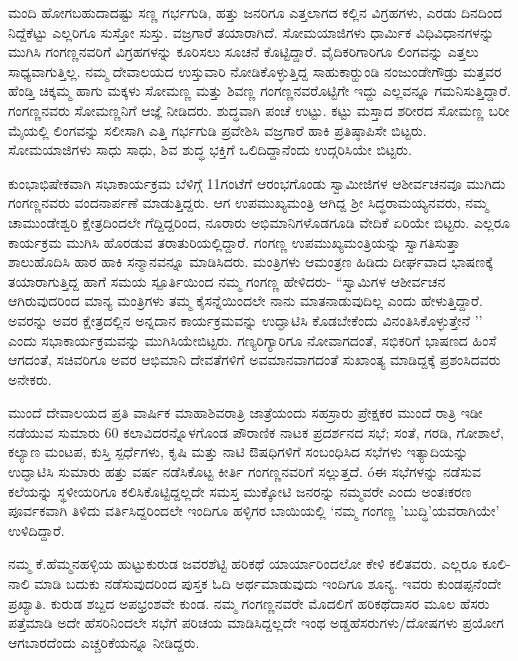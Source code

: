 ಮಂದಿ ಹೋಗಬಹುದಾದಷ್ಟು ಸಣ್ಣ ಗರ್ಭಗುಡಿ, ಹತ್ತು ಜನರಿಗೂ ಎತ್ತಲಾಗದ ಕಲ್ಲಿನ ವಿಗ್ರಹಗಳು, ಎರಡು ದಿನದಿಂದ ನಿದ್ದೆಕೆಟ್ಟು ಎಲ್ಲರಿಗೂ ಸುಸ್ತೋ ಸುಸ್ತು. ವಜ್ರಗಾರೆ ತಯಾರಾಗಿದೆ. ಸೋಮಯಾಜಿಗಳು ಧಾರ್ಮಿಕ ವಿಧಿವಿಧಾನಗಳನ್ನು ಮುಗಿಸಿ ಗಂಗಣ್ಣನವರಿಗೆ ವಿಗ್ರಹಗಳನ್ನು ಕೂರಿಸಲು ಸೂಚನೆ ಕೊಟ್ಟಿದ್ದಾರೆ. ವೈದಿಕರಿಗಾರಿಗೂ ಲಿಂಗವನ್ನು ಎತ್ತಲು ಸಾಧ್ಯವಾಗುತ್ತಿಲ್ಲ. ನಮ್ಮ ದೇವಾಲಯದ ಉಸ್ತುವಾರಿ ನೋಡಿಕೊಳ್ಳುತ್ತಿದ್ದ ಸಾಹುಕಾರ್‍ಹುಂಡಿ ನಂಜುಂಡೇಗೌಡ್ರು ಮತ್ತವರ ಹೆಂಡ್ತಿ ಚಿಕ್ಕಮ್ಮ ಹಾಗು ಮಕ್ಕಳು ಸೋಮಣ್ಣ ಮತ್ತು ಶಿವಣ್ಣ ಗಂಗಣ್ಣನವರೊಟ್ಟಿಗೇ ಇದ್ದು ಎಲ್ಲವನ್ನೂ ಗಮನಿಸುತ್ತಿದ್ದಾರೆ. ಗಂಗಣ್ಣನವರು ಸೋಮಣ್ಣನಿಗೆ ಆಜ್ಞೆ ನೀಡಿದರು. ಶುದ್ಧವಾಗಿ ಪಂಚೆ ಉಟ್ಟು. ಕಟ್ಟು ಮಸ್ತಾದ ಶರೀರದ ಸೋಮಣ್ಣ ಬರೀ ಮೈಯಲ್ಲಿ ಲಿಂಗವನ್ನು ಸಲೀಸಾಗಿ ಎತ್ತಿ ಗರ್ಭಗುಡಿ ಪ್ರವೇಶಿಸಿ ವಜ್ರಗಾರೆ ಹಾಕಿ ಪ್ರತಿಷ್ಠಾಪಿಸೇ ಬಿಟ್ಟರು. ಸೋಮಯಾಜಿಗಳು ಸಾಧು ಸಾಧು, ಶಿವ ಶುದ್ಧ ಭಕ್ತಿಗೆ ಒಲಿದಿದ್ದಾನೆಂದು ಉದ್ಗರಿಸಿಯೇ ಬಿಟ್ಟರು.

ಕುಂಭಾಭಿಷೇಕವಾಗಿ ಸಭಾಕಾರ್ಯಕ್ರಮ ಬೆಳಿಗ್ಗೆ 11ಗಂಟೆಗೆ ಆರಂಭಗೊಂಡು ಸ್ವಾಮೀಜಿಗಳ ಆಶೀರ್ವಚನವೂ ಮುಗಿದು ಗಂಗಣ್ಣನವರು ವಂದನಾರ್ಪಣೆ ಮಾಡುತ್ತಿದ್ದರು. ಆಗ ಉಪಮುಖ್ಯಮಂತ್ರಿ ಆಗಿದ್ದ ಶ್ರೀ ಸಿದ್ಧರಾಮಯ್ಯನವರು, ನಮ್ಮ ಚಾಮುಂಡೇಶ್ವರಿ ಕ್ಷೇತ್ರದಿಂದಲೇ ಗೆದ್ದಿದ್ದರಿಂದ, ನೂರಾರು ಅಭಿಮಾನಿಗಳೊಡಗೂಡಿ ವೇದಿಕೆ ಏರಿಯೇ ಬಿಟ್ಟರು. ಎಲ್ಲರೂ ಕಾರ್ಯಕ್ರಮ ಮುಗಿಸಿ ಹೊರಡುವ ತರಾತುರಿಯಲ್ಲಿದ್ದಾರೆ. ಗಂಗಣ್ಣ ಉಪಮುಖ್ಯಮಂತ್ರಿಯನ್ನು ಸ್ವಾಗತಿಸುತ್ತಾ ಶಾಲುಹೊದಿಸಿ ಹಾರ ಹಾಕಿ ಸನ್ಮಾನವನ್ನೂ ಮಾಡಿಸಿದರು. ಮಂತ್ರಿಗಳು ಆಮಂತ್ರಣ ಹಿಡಿದು ದೀರ್ಘವಾದ ಭಾಷಣಕ್ಕೆ ತಯಾರಾಗುತ್ತಿದ್ದ ಹಾಗೆ ಸಮಯ ಸ್ಪೂರ್ತಿಯಿಂದ ನಮ್ಮ ಗಂಗಣ್ಣ ಹೇಳಿದರು- “ಸ್ವಾಮಿಗಳ ಆಶೀರ್ವಚನ ಆಗಿರುವುದರಿಂದ ಮಾನ್ಯ ಮಂತ್ರಿಗಳು ತಮ್ಮ ಕೈಸನ್ನೆಯಿಂದಲೇ ನಾನು ಮಾತನಾಡುವುದಿಲ್ಲ ಎಂದು ಹೇಳುತ್ತಿದ್ದಾರೆ. ಅವರನ್ನು ಅವರ ಕ್ಷೇತ್ರದಲ್ಲಿನ ಅನ್ನದಾನ ಕಾರ್ಯಕ್ರಮವನ್ನು ಉದ್ಘಾಟಿಸಿ ಕೊಡಬೇಕೆಂದು ವಿನಂತಿಸಿಕೊಳ್ಳುತ್ತೇನೆ ’’ ಎಂದು ಸಭಾಕಾರ್ಯಕ್ರಮವನ್ನು ಮುಗಿಸಿಯೇಬಿಟ್ಟರು. ಗಣ್ಯರಿಗ್ಯಾರಿಗೂ ನೋವಾಗದಂತೆ, ಸಭಿಕರಿಗೆ ಭಾಷಣದ ಹಿಂಸೆ ಆಗದಂತೆ, ಸಚಿವರಿಗೂ ಅವರ ಆಭಿಮಾನಿ ದೇವತೆಗಳಿಗೆ ಅವಮಾನವಾಗದಂತೆ ಸುಖಾಂತ್ಯ ಮಾಡಿದ್ದಕ್ಕೆ ಪ್ರಶಂಸಿದವರು ಅನೇಕರು.

ಮುಂದೆ ದೇವಾಲಯದ ಪ್ರತಿ ವಾರ್ಷಿಕ ಮಾಹಾಶಿವರಾತ್ರಿ ಜಾತ್ರೆಯಂದು ಸಹಸ್ರಾರು ಪ್ರೇಕ್ಷಕರ ಮುಂದೆ ರಾತ್ರಿ ಇಡೀ ನಡೆಯುವ ಸುಮಾರು 60 ಕಲಾವಿದರನ್ನೊಳಗೊಂಡ ಪೌರಾಣಿಕ ನಾಟಕ ಪ್ರದರ್ಶನದ ಸಭೆ;  ಸಂತೆ, ಗರಡಿ, ಗೋಶಾಲೆ, ಕಲ್ಯಾಣ ಮಂಟಪ, ಕುಸ್ತಿ ಸ್ಪರ್ಧೆಗಳು, ಕೃಷಿ ಮತ್ತು ನಾಟಿ ಔಷಧಿಗಳಿಗೆ ಸಂಬಂಧಿಸಿದ ಸಭೆಗಳು ಇತ್ಯಾದಿಯನ್ನು ಉದ್ಘಾಟಿಸಿ ಸುಮಾರು ಹತ್ತು ವರ್ಷ ನಡೆಸಿಕೊಟ್ಟ ಕೀರ್ತಿ ಗಂಗಣ್ಣನವರಿಗೆ ಸಲ್ಲುತ್ತದೆ. óಈ ಸಭೆಗಳನ್ನು ನಡೆಸುವ ಕಲೆಯನ್ನು ಸ್ಥಳೀಯರಿಗೂ ಕಲಿಸಿಕೊಟ್ಟಿದ್ದಲ್ಲದೇ ಸಮಸ್ತ ಮುಕ್ಕೋಟಿ ಜನರನ್ನು ನಮ್ಮವರೇ ಎಂದು ಅಂತಃಕರಣ ಪೂರ್ವಕವಾಗಿ ತಿಳಿದು ವರ್ತಿಸಿದ್ದರಿಂದಲೇ ಇಂದಿಗೂ ಹಳ್ಳಿಗರ ಬಾಯಿಯಲ್ಲಿ `ನಮ್ಮ ಗಂಗಣ್ಣ ’ಬುದ್ಧಿ’ಯವರಾಗಿಯೇ’ ಉಳಿದಿದ್ದಾರೆ.

ನಮ್ಮ ಕೆ.ಹೆಮ್ಮನಹಳ್ಳಿಯ ಹುಟ್ಟುಕುರುಡ ಜವರಶೆಟ್ಟಿ ಹರಿಕಥೆ ಯಾರ್ಯಾರಿಂದಲೋ ಕೇಳಿ ಕಲಿತವರು. ಎಲ್ಲರೂ ಕೂಲಿ-ನಾಲಿ ಮಾಡಿ ಬದುಕು ನಡೆಸುವುದರಿಂದ ಪುಸ್ತಕ ಓದಿ ಅರ್ಥಮಾಡುವುದು ಇಂದಿಗೂ ಶೂನ್ಯ. ಇವರು ಕುಂಡಪ್ಪನೆಂದೇ ಪ್ರಖ್ಯಾತಿ. ಕುರುಡ ಶಬ್ದದ ಅಪಭ್ರಂಶವೇ ಕುಂಡ. ನಮ್ಮ ಗಂಗಣ್ಣನವರೇ ಮೊದಲಿಗೆ ಹರಿಕಥೆದಾಸರ ಮೂಲ ಹೆಸರು ಪತ್ತೆಮಾಡಿ ಅದೇ ಹೆಸರಿನಿಂದಲೇ ಸಭೆಗೆ ಪರಿಚಯ ಮಾಡಿಸಿದ್ದಲ್ಲದೇ ಇಂಥ ಅಡ್ಡಹೆಸರುಗಳು/ದೋಷಗಳು ಪ್ರಯೋಗ ಆಗಬಾರದೆಂದು ಎಚ್ಚರಿಕೆಯನ್ನೂ ನೀಡಿದ್ದರು.

